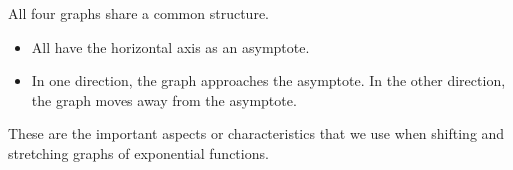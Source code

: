 \documentclass{ximera}
\begin{document}
All four graphs share a common structure.


\begin{itemize}
\item All have the horizontal axis as an asymptote.
\item In one direction, the graph approaches the asymptote. In the other direction, the graph moves away from the asymptote.
\end{itemize}

These are the important aspects or characteristics that we use when shifting and stretching graphs of exponential functions.
\end{document}

